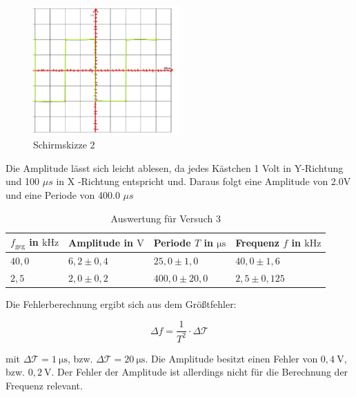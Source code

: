         \begin{figure}[H]
            \centering
            \includegraphics[width=0.5\textwidth]{bilder/Schirmskizze2_2.png}
	        \caption{Schirmskizze 2}
	        \label{fig:versuch3eckig}            
        \end{figure}

        Die Amplitude lässt sich leicht ablesen, da jedes Kästchen 1 Volt in Y-Richtung und 100 $\mu s$ in X -Richtung entspricht und. Daraus folgt eine Amplitude von 2.0V und eine Periode von 400.0 $\mu s$
        
        \begin{table}[H]
            \centering
            \caption{Auswertung für Versuch 3}
            \begin{tabular}{|l|l|l|l|}
                \hline
                $f_{\mathrm{geg}}$ in $\mathrm{kHz}$ & Amplitude in $\mathrm{V}$ & Periode $T$ in $\mathrm{\mu s}$ & Frequenz $f$ in $\mathrm{kHz}$\\
                \hline\hline
                $40,0$ & $6,2 \pm 0,4$ & $25,0 \pm 1,0$ & $40,0 \pm 1,6$\\
                \hline
                $2,5$ & $2,0 \pm 0,2$ & $400,0 \pm 20,0$ & $2,5 \pm 0,125$\\
                \hline
            \end{tabular}
            \label{tab:versuch3}
        \end{table}

        Die Fehlerberechnung ergibt sich aus dem Größtfehler:

        \begin{equation}
            \Delta f = \frac{1}{T^2} \cdot \Delta \mathcal{T}
            \label{eq:größtfehler}
        \end{equation}

        mit $\Delta \mathcal{T} = 1\ \mathrm{\mu s}$, bzw. $\Delta \mathcal{T} = 20\ \mathrm{\mu s}$. Die Amplitude besitzt einen Fehler von $0,4\ \mathrm{V}$, bzw. $0,2\ \mathrm{V}$. Der Fehler der Amplitude ist allerdings nicht für die Berechnung der Frequenz relevant.

